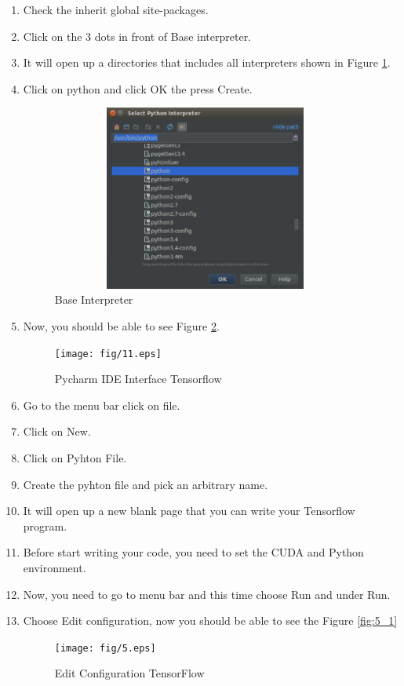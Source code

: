 \documentclass[12pt]{article}
\begin{document}
\begin{enumerate}
  \item Check the inherit global site-packages.
  \item Click on the 3 dots in front of Base interpreter.
  \item It will open up a directories that includes all interpreters shown in Figure \ref{fig:9}.
  \item Click on python and click OK the press Create.
\begin{figure}[h]
	\centerline{\includegraphics[width=4in, height=2.4in]{fig/9.eps}}
	\caption{Base Interpreter}
	\label{fig:9}
\end{figure}
  \item Now, you should be able to see Figure \ref{fig:11}.
\begin{figure}[h]
	\centerline{\texttt{[image: fig/11.eps]}}
	\caption{Pycharm IDE Interface Tensorflow }
	\label{fig:11}
\end{figure}
  \item Go to the menu bar click on file.
  \item Click on New.
  \item Click on Pyhton File.
  \item Create the pyhton file and pick an arbitrary name.
  \item It will open up a new blank page that you can write your Tensorflow program.
  \item Before start writing your code, you need to set the CUDA and Python environment.
  \item Now, you need to go to menu bar and this time choose Run and under Run.
  \item Choose Edit configuration, now you should be able to see the Figure \ref{fig:5_1}
\begin{figure}[h]
	\centerline{\texttt{[image: fig/5.eps]}}
	\caption{Edit Configuration TensorFlow}

\end{figure}
\end{enumerate}
\end{document}
